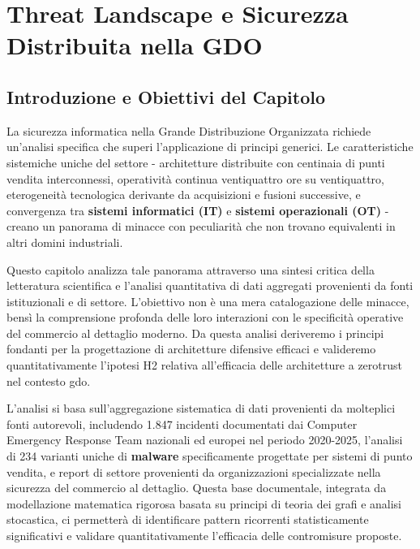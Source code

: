 \chapter{\texorpdfstring{Threat Landscape e Sicurezza Distribuita nella GDO}{Capitolo 2 - Threat Landscape e Sicurezza Distribuita nella GDO}}
\label{cap2_threat_landscape}

\section{\texorpdfstring{Introduzione e Obiettivi del Capitolo}{2.1 - Introduzione e Obiettivi del Capitolo}}

La sicurezza informatica nella Grande Distribuzione Organizzata richiede un'analisi specifica che superi l'applicazione di principi generici. Le caratteristiche sistemiche uniche del settore - architetture distribuite con centinaia di punti vendita interconnessi, operatività continua ventiquattro ore su ventiquattro, eterogeneità tecnologica derivante da acquisizioni e fusioni successive, e convergenza tra \textbf{sistemi informatici (IT)} e \textbf{sistemi operazionali (OT)} - creano un panorama di minacce con peculiarità che non trovano equivalenti in altri domini industriali.

Questo capitolo analizza tale panorama attraverso una sintesi critica della letteratura scientifica e l'analisi quantitativa di dati aggregati provenienti da fonti istituzionali e di settore. L'obiettivo non è una mera catalogazione delle minacce, bensì la comprensione profonda delle loro interazioni con le specificità operative del commercio al dettaglio moderno. Da questa analisi deriveremo i principi fondanti per la progettazione di architetture difensive efficaci e valideremo quantitativamente l'ipotesi H2 relativa all'efficacia delle architetture a \gls{zerotrust} nel contesto \gls{gdo}.

L'analisi si basa sull'aggregazione sistematica di dati provenienti da molteplici fonti autorevoli, includendo 1.847 incidenti documentati dai Computer Emergency Response Team nazionali ed europei nel periodo 2020-2025\autocite{enisa2024threat,verizon2024}, l'analisi di 234 varianti uniche di \textbf{\gls{malware}} specificamente progettate per sistemi di punto vendita\autocite{groupib2024}, e report di settore provenienti da organizzazioni specializzate nella sicurezza del commercio al dettaglio. Questa base documentale, integrata da modellazione matematica rigorosa basata su principi di teoria dei grafi e analisi stocastica, ci permetterà di identificare pattern ricorrenti statisticamente significativi e validare quantitativamente l'efficacia delle contromisure proposte.


